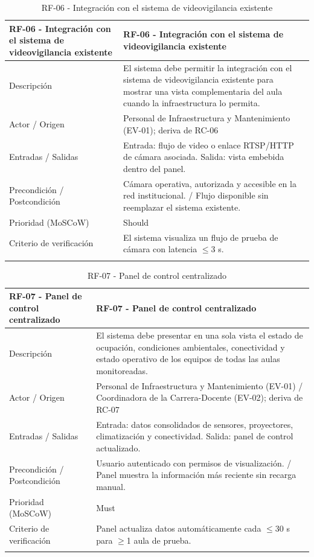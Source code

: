 \begingroup
\small
\begin{longtable}{|p{7.8cm}|p{7.8cm}|}
\hline
RF-06 - Integración con el sistema de videovigilancia existente & RF-06 - Integración con el sistema de videovigilancia existente \\ \hline
Descripción & El sistema debe permitir la integración con el sistema de videovigilancia existente para mostrar una vista complementaria del aula cuando la infraestructura lo permita. \\ \hline
Actor / Origen & Personal de Infraestructura y Mantenimiento (EV-01); deriva de RC-06 \\ \hline
Entradas / Salidas & Entrada: flujo de video o enlace RTSP/HTTP de cámara asociada. Salida: vista embebida dentro del panel. \\ \hline
Precondición / Postcondición & Cámara operativa, autorizada y accesible en la red institucional. / Flujo disponible sin reemplazar el sistema existente. \\ \hline
Prioridad (MoSCoW) & Should \\ \hline
Criterio de verificación & El sistema visualiza un flujo de prueba de cámara con latencia $\leq$3 s. \\ \hline
\caption{RF-06 - Integración con el sistema de videovigilancia existente}
\end{longtable}
\endgroup

\begingroup
\small
\begin{longtable}{|p{7.8cm}|p{7.8cm}|}
\hline
RF-07 - Panel de control centralizado & RF-07 - Panel de control centralizado \\ \hline
Descripción & El sistema debe presentar en una sola vista el estado de ocupación, condiciones ambientales, conectividad y estado operativo de los equipos de todas las aulas monitoreadas. \\ \hline
Actor / Origen & Personal de Infraestructura y Mantenimiento (EV-01) / Coordinadora de la Carrera-Docente (EV-02); deriva de RC-07 \\ \hline
Entradas / Salidas & Entrada: datos consolidados de sensores, proyectores, climatización y conectividad. Salida: panel de control actualizado. \\ \hline
Precondición / Postcondición & Usuario autenticado con permisos de visualización. / Panel muestra la información más reciente sin recarga manual. \\ \hline
Prioridad (MoSCoW) & Must \\ \hline
Criterio de verificación & Panel actualiza datos automáticamente cada $\leq$30 s para $\geq$1 aula de prueba. \\ \hline
\caption{RF-07 - Panel de control centralizado}
\end{longtable}
\endgroup

